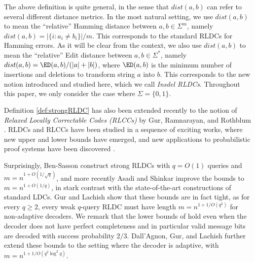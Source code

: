 The above definition is quite general, in the sense that $dist(a,b)$ can refer to several different distance metrics. In the most natural setting, we use $dist(a,b)$ to mean the ``relative'' Hamming distance between $a,b\in \Sigma^m$, namely $dist(a,b)=|\{i\colon a_i\ne b_i\}|/m$. This corresponds to the standard RLDCs for Hamming errors. As it will be clear from the context, we also use $dist(a,b)$ to mean the ``relative'' Edit distance between $a,b \in \Sigma^*$,  namely $dist(a, b)=\ED(a, b)/(|a|+|b|)$, where $\ED(a, b)$ is the minimum number of insertions and deletions to transform string $a$ into $b$. This corresponds to the new notion introduced and studied here, which we call {\em  Insdel RLDCs}. Throughout this paper, we only consider the case where $\Sigma=\{0,1\}$.



Definition \ref{def:strongRLDC} has also been extended recently to the notion of {\em Relaxed Locally Correctable Codes (RLCCs)} by Gur, Ramnarayan, and Rothblum \cite{GurRR20}. RLDCs and RLCCs have been studied  in a sequence of exciting works, where new upper and lower bounds have emerged, and new applications to probabilistic proof systems have been discovered \cite{gur2019lower, ChiesaGS20, GurRR20, AsadiS21, GurL21}.

Surprisingly, Ben-Sasson \etal \cite{Ben-SassonGHSV06} construct strong RLDCs with $q=O(1)$ queries and  $m=n^{1+O(1/\sqrt{q})}$, and more recently Asadi and Shinkar \cite{AsadiS21} improve the bounds to $m=n^{1+O(1/q)}$, in stark contrast with the state-of-the-art constructions of standard LDCs. 
Gur and Lachish \cite{GurL21} show that these bounds are in fact tight, as for every $q\geq 2$, every weak $q$-query RLDC must have length  $m=n^{1+1/O(q^{2})}$ for non-adaptive decoders. 
 We remark that the lower bounds of \cite{GurL21} hold even when the decoder does not have perfect completeness and in particular valid message bits are decoded with success probability $2/3.$ 
 Dall'Agnon, Gur, and Lachish \cite{dall2021structural} further extend these bounds to the setting where the decoder is adaptive, with $m=n^{1+1/O(q^{2}\log^2 q)}.$ 
 
